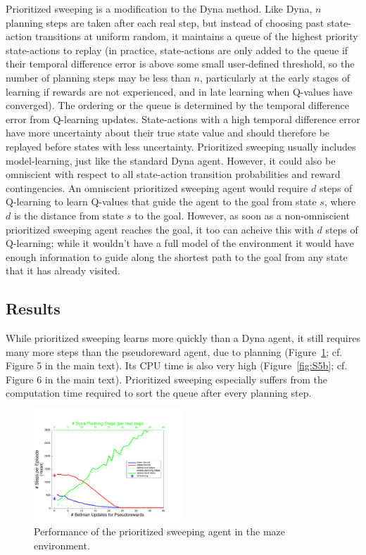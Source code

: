 \documentclass[letterpaper]{article}
\begin{document}
Prioritized sweeping is a modification to the Dyna method. Like Dyna, $n$ planning steps are taken after each real step, but instead of choosing past state-action transitions at uniform random, it maintains a queue of the highest priority state-actions to replay (in practice, state-actions are only added to the queue if their temporal difference error is above some small user-defined threshold, so the number of planning steps may be less than $n$, particularly at the early stages of learning if rewards are not experienced, and in late learning when Q-values have converged). The ordering or the queue is determined by the temporal difference error from Q-learning updates. State-actions with a high temporal difference error have more uncertainty about their true state value and should therefore be replayed before states with less uncertainty. Prioritized sweeping usually includes model-learning, just like the standard Dyna agent. However, it could also be omniscient with respect to all state-action transition probabilities and reward contingencies. An omniscient prioritized sweeping agent would require $d$ steps of Q-learning to learn Q-values that guide the agent to the goal from state $s$, where $d$ is the distance from state $s$ to the goal. However, as soon as a non-omniscient prioritized sweeping agent reaches the goal, it too can acheive this with $d$ steps of Q-learning; while it wouldn't have a full model of the environment it would have enough information to guide along the shortest path to the goal from any state that it has already visited.

\subsection{Results}

While prioritized sweeping learns more quickly than a Dyna agent, it still requires many more steps than the pseudoreward agent, due to planning (Figure~\ref{fig:S5a}; cf. Figure 5 in the main text). Its CPU time is also very high (Figure~\ref{fig:S5b}; cf. Figure 6 in the main text). Prioritized sweeping especially suffers from the computation time required to sort the queue after every planning step.

\begin{figure}[ht]
\centering
\includegraphics[width=0.5\textwidth]{learning_vs_PRiterationsSweeping_DYNA_mean}
\caption{Performance of the prioritized sweeping agent in the maze environment.}
\label{fig:S5a}
\end{figure}
\end{document}
